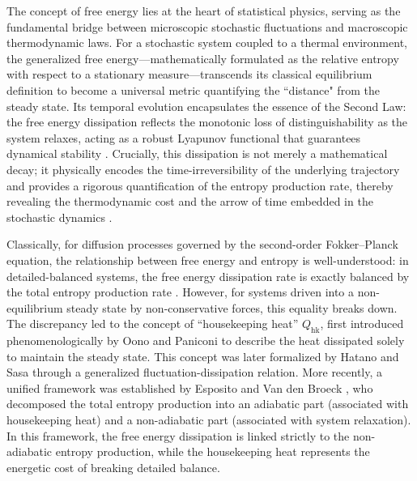 \documentclass[10pt]{article}
\theoremstyle{definition}
\numberwithin{equation}{section}
\begin{document}
The concept of free energy lies at the heart of statistical physics, serving as the fundamental bridge between microscopic stochastic fluctuations and macroscopic thermodynamic laws. 
For a stochastic system coupled to a thermal environment, 
the generalized free energy—mathematically formulated as the relative entropy with respect to a stationary measure—transcends its classical equilibrium definition to become a universal metric quantifying the ``distance" from the steady state. 
Its temporal evolution encapsulates the essence of the Second Law: 
the free energy dissipation reflects the monotonic loss of distinguishability as the system relaxes, acting as a robust Lyapunov functional that guarantees dynamical stability \cite{NP77,DM62,JQQ04}. 
Crucially, this dissipation is not merely a mathematical decay; 
it physically encodes the time-irreversibility of the underlying trajectory and provides a rigorous quantification of the entropy production rate, thereby revealing the thermodynamic cost and the arrow of time embedded in the stochastic dynamics \cite{stochasticThermo1,stochasticThermo2,GQ10,QQT02,VE10,EV10}.

Classically, for diffusion processes governed by the second-order Fokker--Planck equation, 
the relationship between free energy and entropy is well-understood: in detailed-balanced systems, the free energy dissipation rate is exactly balanced by the total entropy production rate \cite{QQT02,VE10, DP23}. 
However, for systems driven into a non-equilibrium steady state by non-conservative forces, this equality breaks down. The discrepancy led to the concept of ``housekeeping heat'' $Q_\mathrm{hk}$, first introduced phenomenologically by Oono and Paniconi \cite{OP98} to describe the heat dissipated solely to maintain the steady state. 
This concept was later formalized by Hatano and Sasa \cite{HS01} through a generalized fluctuation-dissipation relation. 
More recently, a unified framework was established by Esposito and Van den Broeck \cite{esposito2010,EV10,VE10}, who decomposed the total entropy production into an adiabatic part (associated with housekeeping heat) and a non-adiabatic part (associated with system relaxation).
In this framework, the free energy dissipation is linked strictly to the non-adiabatic entropy production, 
while the housekeeping heat represents the energetic cost of breaking detailed balance. 
\end{document}
